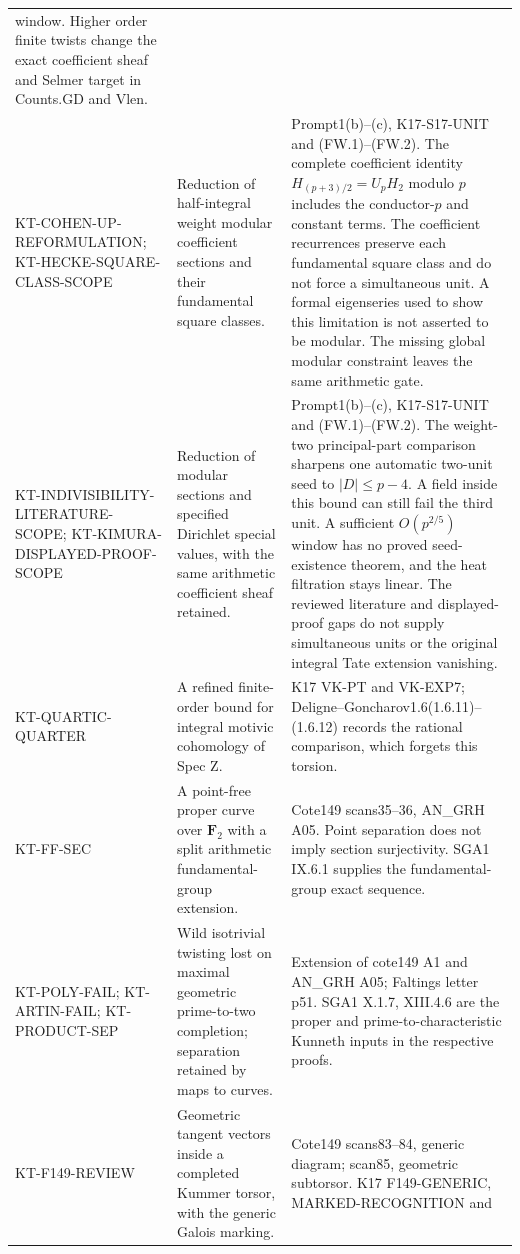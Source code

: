 \documentclass[11pt,a4paper]{article}
\theoremstyle{definition}
\begin{document}
\begin{longtable}{>{\raggedright\arraybackslash}p{}
>{\raggedright\arraybackslash}p{}
>{\raggedright\arraybackslash}p{}}
window. Higher order finite twists change the exact coefficient
sheaf and Selmer target in Counts.GD and Vlen.\\
KT-COHEN-UP-REFORMULATION;
KT-HECKE-SQUARE-CLASS-SCOPE &
Reduction of half-integral weight modular coefficient sections
and their fundamental square classes. &
Prompt1(b)--(c), K17-S17-UNIT and (FW.1)--(FW.2).
The complete coefficient identity $H_{(p+3)/2}=U_pH_2$ modulo $p$
includes the conductor-$p$ and constant terms. The coefficient
recurrences preserve each fundamental square class and do not
force a simultaneous unit. A formal eigenseries used to show
this limitation is not asserted to be modular. The missing
global modular constraint leaves the same arithmetic gate.\\
KT-INDIVISIBILITY-LITERATURE-SCOPE;
KT-KIMURA-DISPLAYED-PROOF-SCOPE &
Reduction of modular sections and specified Dirichlet special values,
with the same arithmetic coefficient sheaf retained. &
Prompt1(b)--(c), K17-S17-UNIT and (FW.1)--(FW.2).
The weight-two principal-part comparison sharpens one automatic
two-unit seed to $|D|\leq p-4$. A field inside this bound can still
fail the third unit. A sufficient $O(p^{2/5})$ window has no proved
seed-existence theorem, and the heat filtration stays linear.
The reviewed literature and displayed-proof gaps do not supply
simultaneous units or the original integral Tate extension vanishing.\\
KT-QUARTIC-QUARTER &
A refined finite-order bound for integral motivic cohomology
of Spec Z. &
K17 VK-PT and VK-EXP7; Deligne--Goncharov1.6(1.6.11)--(1.6.12)
records the rational comparison, which forgets this torsion.\\
KT-FF-SEC &
A point-free proper curve over $\mathbf F_2$ with a split
arithmetic fundamental-group extension. &
Cote149 scans35--36, AN\_GRH A05. Point separation does not
imply section surjectivity. SGA1 IX.6.1 supplies the
fundamental-group exact sequence.\\
KT-POLY-FAIL; KT-ARTIN-FAIL; KT-PRODUCT-SEP &
Wild isotrivial twisting lost on maximal geometric
prime-to-two completion; separation retained by maps to curves. &
Extension of cote149 A1 and AN\_GRH A05; Faltings letter p51.
SGA1 X.1.7, XIII.4.6 are the proper and prime-to-characteristic
Kunneth inputs in the respective proofs.\\
KT-F149-REVIEW &
Geometric tangent vectors inside a completed Kummer torsor,
with the generic Galois marking. &
Cote149 scans83--84, generic diagram; scan85, geometric
subtorsor. K17 F149-GENERIC, MARKED-RECOGNITION and

\end{longtable}
\end{document}

